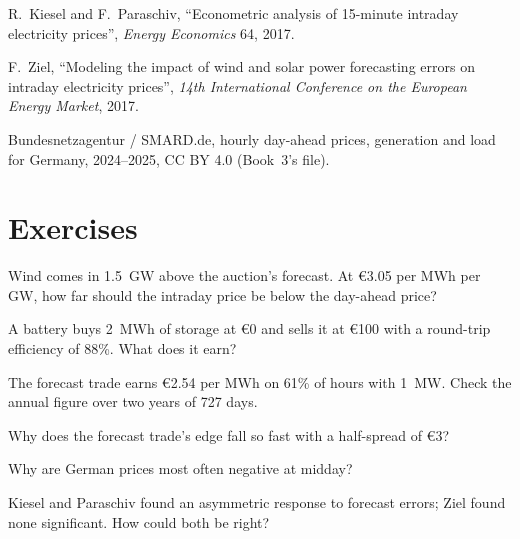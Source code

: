 \begin{omsources}
\item R.~Kiesel and F.~Paraschiv, ``Econometric analysis of 15-minute intraday electricity prices'', \emph{Energy Economics} 64, 2017.
\item F.~Ziel, ``Modeling the impact of wind and solar power forecasting errors on intraday electricity prices'', \emph{14th International Conference
on the European Energy Market}, 2017.
\item Bundesnetzagentur / SMARD.de, hourly day-ahead prices, generation and load for Germany, 2024--2025, CC BY 4.0 (Book~3's file).
\end{omsources}

\section{Exercises}

\begin{exercise}[$\star$]\label{exo:s2:power-and-gas-trading:1}
Wind comes in 1.5~GW above the auction's forecast. At \euro3.05 per MWh per GW, how far should the intraday price be below the day-ahead price?
\end{exercise}

\begin{exercise}[$\star$]\label{exo:s2:power-and-gas-trading:2}
A battery buys 2~MWh of storage at \euro0 and sells it at \euro100 with a round-trip efficiency of 88\%. What does it earn?
\end{exercise}

\begin{exercise}[$\star$]\label{exo:s2:power-and-gas-trading:3}
The forecast trade earns \euro2.54 per MWh on 61\% of hours with 1~MW. Check the annual figure over two years of 727 days.
\end{exercise}

\begin{exercise}[$\star\star$]\label{exo:s2:power-and-gas-trading:4}
Why does the forecast trade's edge fall so fast with a half-spread of \euro3?
\end{exercise}

\begin{exercise}[$\star\star$]\label{exo:s2:power-and-gas-trading:5}
Why are German prices most often negative at midday?
\end{exercise}

\begin{exercise}[$\star\star$]\label{exo:s2:power-and-gas-trading:6}
Kiesel and Paraschiv found an asymmetric response to forecast errors; Ziel found none significant. How could both be right?
\end{exercise}

